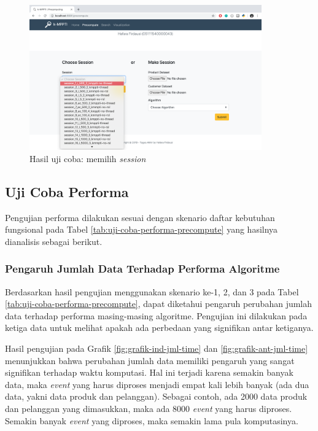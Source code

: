 \begin{figure}[H]
	\centering
	\includegraphics[width=10cm]{assets/img/bab5/hasil7.png}
	\caption{Hasil uji coba: memilih \textit{session}}
	\label{fig:hasil-performa7}
\end{figure}

\subsection{Uji Coba Performa}
\tab Pengujian performa dilakukan sesuai dengan skenario daftar kebutuhan fungsional pada Tabel \ref{tab:uji-coba-performa-precompute} yang hasilnya dianalisis sebagai berikut. 

\subsubsection{Pengaruh Jumlah Data Terhadap Performa Algoritme}

\tab Berdasarkan hasil pengujian menggunakan skenario ke-1, 2, dan 3 pada Tabel \ref{tab:uji-coba-performa-precompute}, dapat diketahui pengaruh perubahan jumlah data terhadap performa masing-masing algoritme. Pengujian ini dilakukan pada ketiga data untuk melihat apakah ada perbedaan yang signifikan antar ketiganya.

Hasil pengujian pada Grafik \ref{fig:grafik-ind-jml-time} dan \ref{fig:grafik-ant-jml-time} menunjukkan bahwa perubahan jumlah data memiliki pengaruh yang sangat signifikan terhadap waktu komputasi. Hal ini terjadi karena semakin banyak data, maka \textit{event} yang harus diproses menjadi empat kali lebih banyak (ada dua data, yakni data produk dan pelanggan). Sebagai contoh, ada 2000 data produk dan pelanggan yang dimasukkan, maka ada 8000 \textit{event} yang harus diproses. Semakin banyak \textit{event} yang diproses, maka semakin lama pula komputasinya.

